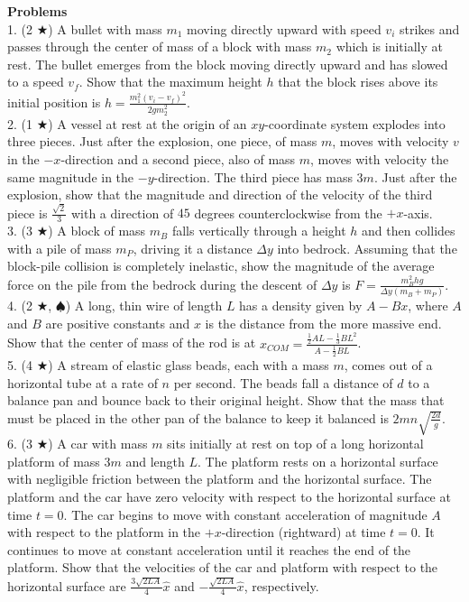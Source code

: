 \noindent \textbf{Problems}\\
1. (2 $\bigstar$) A bullet with mass $m_1$ moving directly upward with speed $v_i$ strikes and passes through the center of mass of a block with mass $m_2$ which is initially at rest. The bullet emerges from the block moving directly upward and has slowed to a speed $v_f$. Show that the maximum height $h$ that the block rises above its initial position is $h = \frac{m_1^2 (v_i-v_f)^2}{2gm_2^2}$.\\
2. (1 $\bigstar$) A vessel at rest at the origin of an $xy$-coordinate system explodes into three pieces. Just after the explosion, one piece, of mass $m$, moves with velocity $v$ in the $-x$-direction and a second piece, also of mass $m$, moves with velocity the same magnitude in the $-y$-direction. The third piece has mass $3m$. Just after the explosion, show that the magnitude and direction of the velocity of the third piece is $\frac{\sqrt{2}}{3}$ with a direction of $45$ degrees counterclockwise from the $+x$-axis.\\
3. (3 $\bigstar$) A block of mass $m_B$ falls vertically through a height $h$ and then collides with a pile of mass $m_P$, driving it a distance $\Delta y$ into bedrock. Assuming that the block-pile collision is completely inelastic, show the magnitude of the average force on the pile from the bedrock during the descent of $\Delta y$ is $F = \frac{m_B^2hg}{\Delta y(m_B+m_P)}$.\\
4. (2 $\bigstar$, $\spadesuit$) A long, thin wire of length $L$ has a density given by $A-Bx$, where $A$ and $B$ are positive constants and $x$ is the distance from the more massive end. Show that the center of mass of the rod is at $x_{COM} = \frac{\frac{1}{2}AL-\frac{1}{3}BL^2}{A-\frac{1}{2}BL}$.\\
5. (4 $\bigstar$) A stream of elastic glass beads, each with a mass $m$, comes out of a horizontal tube at a rate of $n$ per second. The beads fall a distance of $d$ to a balance pan and bounce back to their original height. Show that the mass that must be placed in the other pan of the balance to keep it balanced is $2mn\sqrt{\frac{2d}{g}}$.\\
6. (3 $\bigstar$) A car with mass $m$ sits initially at rest on top of a long horizontal platform of mass $3m$ and length $L$. The platform rests on a horizontal surface with negligible friction between the platform and the horizontal surface. The platform and the car have zero velocity with respect to the horizontal surface at time $t=0$. The car begins to move with constant acceleration of magnitude $A$ with respect to the platform in the $+x$-direction (rightward) at time $t=0$. It continues to move at constant acceleration until it reaches the end of the platform. Show that the velocities of the car and platform with respect to the horizontal surface are $\frac{3\sqrt{2LA}}{4} \hat x$ and $-\frac{\sqrt{2LA}}{4} \hat x$, respectively.\\ 
